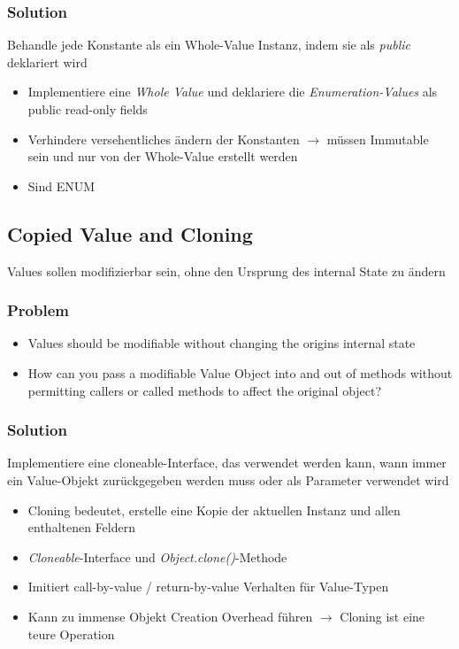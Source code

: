 \subsubsection{Solution}
Behandle jede Konstante als ein Whole-Value Instanz, indem sie als \textit{public} deklariert wird
\begin{itemize}
    \item Implementiere eine \textit{Whole Value} und deklariere die \textit{Enumeration-Values} als public read-only fields
    \item Verhindere versehentliches ändern der Konstanten $\rightarrow$ müssen Immutable sein und nur von der Whole-Value erstellt werden
    \item Sind ENUM
\end{itemize}

\subsection{Copied Value and Cloning}
Values sollen modifizierbar sein, ohne den Ursprung des internal State zu ändern
\subsubsection{Problem}
\begin{itemize}
    \item Values should be modifiable without changing the origins internal state
    \item How can you pass a modifiable Value Object into and out of methods without permitting callers or called methods to affect the original object?
\end{itemize}

\subsubsection{Solution}
Implementiere eine cloneable-Interface, das verwendet werden kann, wann immer ein Value-Objekt zurückgegeben werden muss oder als Parameter verwendet wird

\begin{itemize}
    \item Cloning bedeutet, erstelle eine Kopie der aktuellen Instanz und allen enthaltenen Feldern
    \item \textit{Cloneable}-Interface und \textit{Object.clone()}-Methode
    \item Imitiert call-by-value / return-by-value Verhalten für Value-Typen
    \item Kann zu immense Objekt Creation Overhead führen $\rightarrow$ Cloning ist eine teure Operation
\end{itemize}

